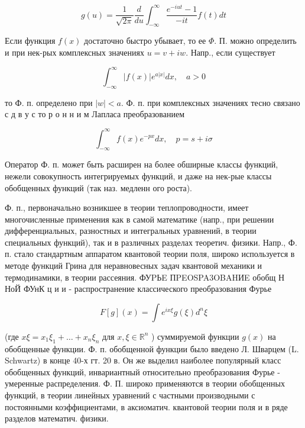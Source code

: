 \documentclass[10pt]{article}
\begin{document}
\[

g(u)=\frac{1}{\sqrt{2 \pi}} \frac{d}{d u} \int_{-\infty}^{\infty} \frac{e^{-i u t}-1}{-i t} f(t) d t

\]



Если функция $f(x)$ достаточно быстро убывает, то ее $\Phi$. П. можно определить и при нек-рых комплексных значениях $u=v+i w$. Напр., если существует



\[

\int_{-\infty}^{\infty}|f(x)| e^{a|x|} d x, \quad a>0

\]



то Ф. п. определено при $|w|<a$. Ф. п. при комплексных значениях тесно связано с д в у с то р о н н и м Лапласа преобразованием



\[

\int_{-\infty}^{\infty} f(x) e^{-p x} d x, \quad p=s+i \sigma

\]



Оператор Ф. п. может быть расширен на более обширные классы функций, нежели совокупность интегрируемых функций, и даже на нек-рые классы обобщенных функций (так наз. медленн ого роста).



Ф. п., первоначально возникшее в теории теплопроводности, имеет многочисленные применения как в самой математике (напр., при решении дифференциальных, разностных и интегральных уравнений, в теории специальных функций), так и в различных разделах теоретич. физики. Напр., Ф. п. стало стандартным аппаратом квантовой теории поля, широко используется в методе функций Грина для неравновесных задач квантовой механики и термодинамики, в теории рассеяния. ФУPЬE ПPEOSPA3OBAHИE обобщ Н НоЙ ФУнК ц и и - распространение классического преобразования Фурье



\[

F[g](x)=\int e^{i x \xi} g(\xi) d^{n} \xi

\]



(где $x \xi=x_{1} \xi_{1}+\ldots+x_{n} \xi_{n}$ для $x, \xi \in \mathbb{R}^{n}$ ) суммируемой функции $g(x)$ на обобщенные функции. Ф. п. обобщенной функции было введено Л. Шварцем (L. Schwartz) в конце 40-х гт. 20 в. Он же выделил наиболее популярный класс обобщенных функций, инвариантный относительно преобразования Фурье - умеренные распределения. Ф. П. широко применяются в теории обобщенных функций, в теории линейных уравнений с частными производными с постоянными коэффициентами, в аксиоматич. квантовой теории поля и в ряде разделов математич. физики.
\end{document}
